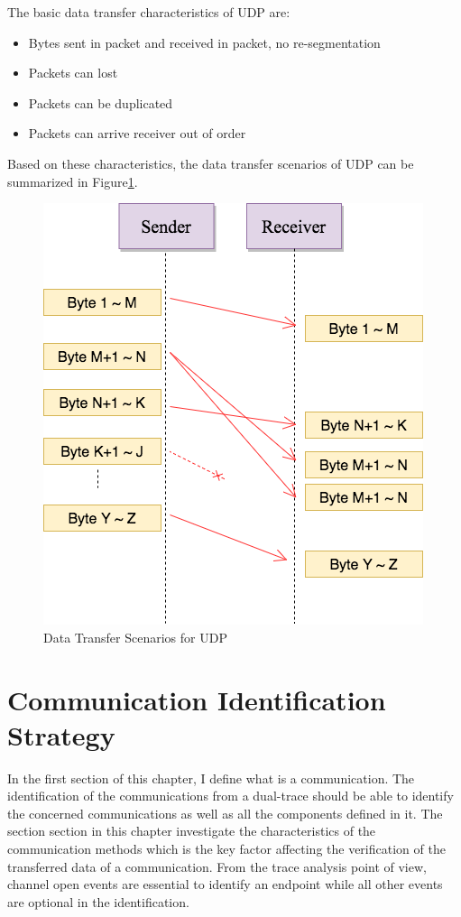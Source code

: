 The basic data transfer characteristics of UDP are:
\begin{itemize}
  \item Bytes sent in packet and received in packet, no re-segmentation
  \item Packets can lost
  \item Packets can be duplicated
  \item Packets can arrive receiver out of order
\end{itemize}

Based on these characteristics, the data transfer scenarios of UDP can be summarized in Figure\ref{upd}.
\begin{figure}[H]
\centerline{\includegraphics[scale=0.48]{Figures/udp}}
 \caption{Data Transfer Scenarios for UDP}
\label{upd}
\end{figure}

\section{Communication Identification Strategy}
In the first section of this chapter, I define what is a communication. The identification of the communications from a dual-trace should be able to identify the concerned communications as well as all the components defined in it. The section section in this chapter investigate the characteristics of the communication methods which is the key factor affecting the verification of the transferred data of a communication. From the trace analysis point of view, channel open events are essential to identify an endpoint while all other events are optional in the identification.

